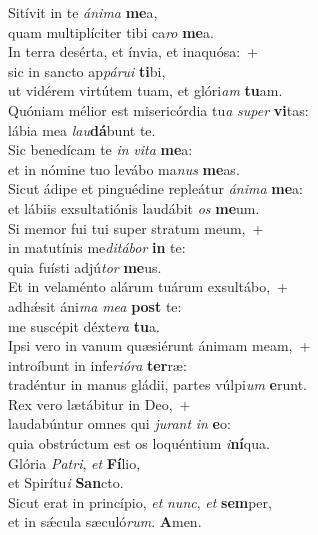\evenverse Sitívit in te \textit{á}\textit{ni}\textit{ma} \textbf{me}a,~\*\\
\evenverse quam multiplíciter tibi ca\textit{ro} \textbf{me}a.\\
\oddverse In terra desérta, et ínvia, et inaquósa:~+\\
\oddverse  sic in sancto ap\textit{pá}\textit{ru}\textit{i} \textbf{ti}bi,~\*\\
\oddverse ut vidérem virtútem tuam, et glóri\textit{am} \textbf{tu}am.\\
\evenverse Quóniam mélior est misericórdia tu\textit{a} \textit{su}\textit{per} \textbf{vi}tas:~\*\\
\evenverse lábia mea \textit{lau}\textbf{dá}bunt te.\\
\oddverse Sic benedícam te \textit{in} \textit{vi}\textit{ta} \textbf{me}a:~\*\\
\oddverse et in nómine tuo levábo ma\textit{nus} \textbf{me}as.\\
\evenverse Sicut ádipe et pinguédine repleátur \textit{á}\textit{ni}\textit{ma} \textbf{me}a:~\*\\
\evenverse et lábiis exsultatiónis laudábit \textit{os} \textbf{me}um.\\
\oddverse Si memor fui tui super stratum meum,~+\\
\oddverse  in matutínis me\textit{di}\textit{tá}\textit{bor} \textbf{in} te:~\*\\
\oddverse quia fuísti adjú\textit{tor} \textbf{me}us.\\
\evenverse Et in velaménto alárum tuárum exsultábo,~+\\
\evenverse  adhǽsit áni\textit{ma} \textit{me}\textit{a} \textbf{post} te:~\*\\
\evenverse me suscépit déxte\textit{ra} \textbf{tu}a.\\
\oddverse Ipsi vero in vanum quæsiérunt ánimam meam,~+\\
\oddverse  introíbunt in infe\textit{ri}\textit{ó}\textit{ra} \textbf{ter}ræ:~\*\\
\oddverse tradéntur in manus gládii, partes vúlpi\textit{um} \textbf{e}runt.\\
\evenverse Rex vero lætábitur in Deo,~+\\
\evenverse  laudabúntur omnes qui \textit{ju}\textit{rant} \textit{in} \textbf{e}o:~\*\\
\evenverse quia obstrúctum est os loquéntium \textit{i}\textbf{ní}qua.\\
\oddverse Glória \textit{Pa}\textit{tri}, \textit{et} \textbf{Fí}lio,~\*\\
\oddverse et Spirítu\textit{i} \textbf{San}cto.\\
\evenverse Sicut erat in princípio, \textit{et} \textit{nunc}, \textit{et} \textbf{sem}per,~\*\\
\evenverse et in sǽcula sæculó\textit{rum}. \textbf{A}men.\\
